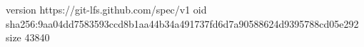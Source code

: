 version https://git-lfs.github.com/spec/v1
oid sha256:9aa04dd7583593ccd8b1aa44b34a491737fd6d7a90588624d9395788cd05e292
size 43840
